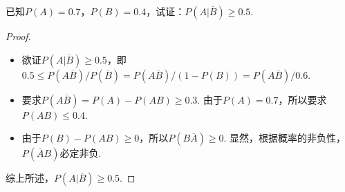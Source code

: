 \begin{problem}
    已知$P(A)=0.7$，$P(B)=0.4$，试证：$P(A|\overline B)\geq 0.5$.
\end{problem}
\begin{solution}
\begin{proof}\leavevmode
    \begin{itemize}
        \item 欲证$P(A|\overline B)\geq0.5$，即$0.5\leq P(A\overline B)/P(\overline B)=P(A\overline B)/(1-P(B))=P(A\overline B)/0.6$.
        \item 要求$P(A\overline B)=P(A)-P(AB)\geq0.3$. 由于$P(A)=0.7$，所以要求$P(AB)\leq0.4$.
        \item 由于$P(B)-P(AB)\geq0$，所以$P(B\overline A)\geq0$. 显然，根据概率的非负性，$P(\overline AB)$必定非负.
    \end{itemize}

综上所述，$P(A|\overline B)\geq 0.5$.
\end{proof}
\end{solution}